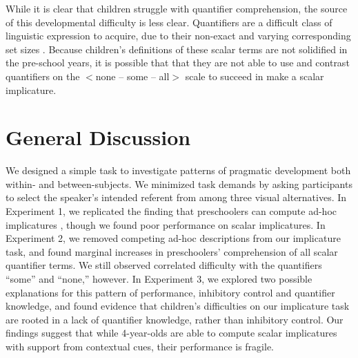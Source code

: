 \documentclass[man]{apa2}
\begin{document}
{While it is clear that children struggle with quantifier comprehension, the source of this developmental difficulty is less clear. Quantifiers are a difficult class of linguistic expression to acquire, due to their non-exact and varying corresponding set sizes \cite{hurewitz2006}. Because children's definitions of these scalar terms are not solidified in the pre-school years, it is possible that that they are not able to use and contrast quantifiers on the $<${\sc none -- some -- all}$>$ scale to succeed in make a scalar implicature.

\section{General Discussion}

We designed a simple task to investigate patterns of pragmatic development both within- and between-subjects. We minimized task demands by asking participants to select the speaker's intended referent from among three visual alternatives. In Experiment 1, we replicated the finding that preschoolers can compute ad-hoc implicatures \cite{stiller2015}, though we found poor performance on scalar implicatures. In Experiment 2, we removed competing ad-hoc descriptions from our implicature task, and found marginal increases in preschoolers' comprehension of all scalar quantifier terms. We still observed correlated difficulty with the quantifiers ``some'' and ``none,'' however. In Experiment 3, we explored two possible explanations for this pattern of performance, inhibitory control and quantifier knowledge, and found evidence that children's difficulties on our implicature task are rooted in a lack of quantifier knowledge, rather than inhibitory control. Our findings suggest that while 4-year-olds are able to compute scalar implicatures with support from contextual cues, their performance is fragile.

}
\end{document}
